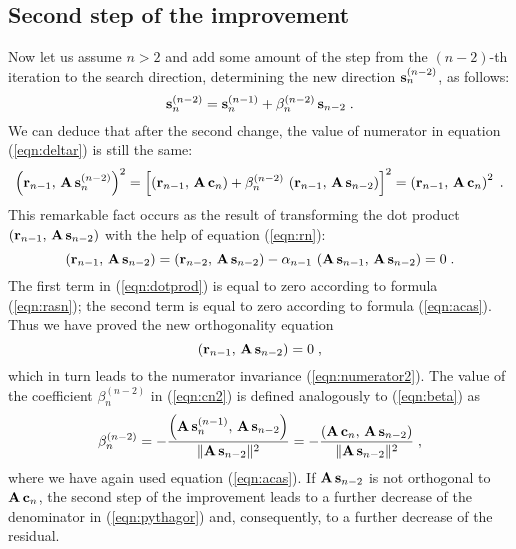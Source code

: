 \subsection{Second step of the improvement}
Now let us assume $n > 2$ and add some amount of the step from
the $(n-2)$-th iteration to the search direction, determining the new
direction ${\bf s}_n^{(n-2)}$, as follows:
\begin{equation}
{\bf s}_n^{(n-2)} =  {\bf s}_n^{(n-1)} + \beta_n^{(n-2)}\,{\bf s}_{n-2}\;.
\label{eqn:cn2}
\end{equation}
We can deduce that after the second change, the value of numerator in
equation (\ref{eqn:deltar}) is still the same:
\begin{equation}
\left({\bf r}_{n-1},\,{\bf A\,s}_n^{(n-2)}\right)^2 = \left[
\left({\bf r}_{n-1},\,{\bf A\,c}_n\right) + \beta_n^{(n-2)}\,
\left({\bf r}_{n-1},\,{\bf A\,s}_{n-2}\right)\right]^2 =
\left({\bf r}_{n-1},\,{\bf A\,c}_n\right)^2\;.
\label{eqn:numerator2}
\end{equation}
This remarkable fact occurs as the result of transforming the dot product $\left({\bf
r}_{n-1},\,{\bf A\,s}_{n-2}\right)$ with the help of equation
(\ref{eqn:rn}):
\begin{equation}
\left({\bf r}_{n-1},\,{\bf A\,s}_{n-2}\right) =
\left({\bf r}_{n-2},\,{\bf A\,s}_{n-2}\right) -
\alpha_{n-1}\,\left({\bf A\,s}_{n-1},\,{\bf A\,s}_{n-2}\right) = 0\;.
\label{eqn:dotprod}
\end{equation}
The first term in (\ref{eqn:dotprod}) is equal to zero according to formula
(\ref{eqn:rasn}); the second term is equal to zero according to formula
(\ref{eqn:acas}). Thus we have proved the new orthogonality equation
\begin{equation}
\left({\bf r}_{n-1},\,{\bf A\,s}_{n-2}\right) = 0\;,
\label{eqn:rasn2}
\end{equation}
which in turn leads to the numerator invariance (\ref{eqn:numerator2}). The
value of the coefficient $\beta_n^{(n-2)}$ in (\ref{eqn:cn2}) is defined
analogously to (\ref{eqn:beta}) as
\begin{equation}
\beta_n^{(n-2)} = - 
{{\left({\bf A\,s}_n^{(n-1)},\,{\bf A\,s}_{n-2}\right)} \over
{\|{\bf A\,s}_{n-2}\|^2}} = 
- {{\left({\bf A\,c}_n,\,{\bf A\,s}_{n-2}\right)} \over
{\|{\bf A\,s}_{n-2}\|^2}}\;,
\label{eqn:beta2}
\end{equation}
where we have again used equation (\ref{eqn:acas}). If ${\bf A\,s}_{n-2}$ is
not orthogonal to ${\bf A\,c}_n$, the second step of the improvement leads
to a further decrease of the denominator in (\ref{eqn:pythagor}) and,
consequently, to a further decrease of the residual.


